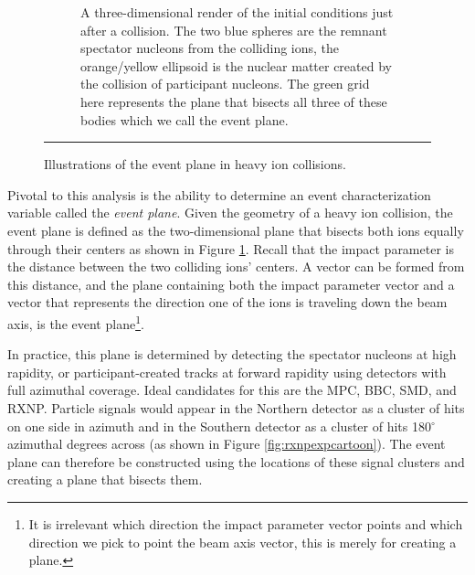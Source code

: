 \begin{figure}[htbp!]
\begin{subfigure}[p]{0.55\textwidth}
	\caption[Central vs Peripheral collisions, geometry of initial conditions]{A three-dimensional render of the initial conditions just after a collision. The two blue spheres are the remnant spectator nucleons from the colliding ions, the orange/yellow ellipsoid is the nuclear matter created by the collision of participant nucleons. The green grid here represents the plane that bisects all three of these bodies which we call the event plane.}
    \end{subfigure}
    \rule{35em}{0.5pt}
  \caption[Illustrations of the event plane in heavy ion collisions.]{Illustrations of the event plane in heavy ion collisions.}
  \label{fig:evtpln}
\end{figure}

Pivotal to this analysis is the ability to determine an event characterization variable called the \textit{event plane}. Given the geometry of a heavy ion collision, the event plane is defined as the two-dimensional plane that bisects both ions equally through their centers as shown in Figure \ref{fig:evtpln}. Recall that the impact parameter is the distance between the two colliding ions' centers. A vector can be formed from this distance, and the plane containing both the impact parameter vector and a vector that represents the direction one of the ions is traveling down the beam axis, is the event plane\footnote{It is irrelevant which direction the impact parameter vector points and which direction we pick to point the beam axis vector, this is merely for creating a plane.}.

In practice, this plane is determined by detecting the spectator nucleons at high rapidity, or participant-created tracks at forward rapidity using detectors with full azimuthal coverage. Ideal candidates for this are the MPC, BBC, SMD, and RXNP. Particle signals would appear in the Northern detector as a cluster of hits on one side in azimuth and in the Southern detector as a cluster of hits 180$^\circ$ azimuthal degrees across (as shown in Figure \ref{fig:rxnpexpcartoon}). The event plane can therefore be constructed using the locations of these signal clusters and creating a plane that bisects them.

